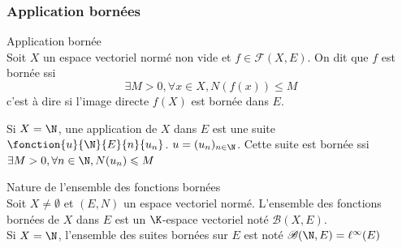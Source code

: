 \subsubsection{Application bornées}

\begin{definition}{Application bornée}{}
    \\Soit $X$ un espace vectoriel normé non vide et $f \in \mathscr F(X, E)$. 
    On dit que $f$ est bornée ssi
     $$\exists M > 0, \forall x \in X, N(f(x)) \leqslant M$$
    c'est à dire si l'image directe $f(X)$ est bornée dans $E$. 
\end{definition}

\begin{exemple}
    Si $X = \N$, une application de $X$ dans $E$ est une suite $\fonction{u}{\N}{E}{n}{u_n}$.
    $u = (u_n)_{n \in \N}$.  Cette suite est bornée ssi $\exists M > 0, \forall n \in \N, N(u_n) \leqslant M$
\end{exemple}

\begin{proposition}{Nature de l'ensemble des fonctions bornées}{}
    \\Soit $X \neq \emptyset$ et $(E, N)$ un espace vectoriel normé. 
    L'ensemble des fonctions bornées de $X$ dans $E$ est un $\K$-espace vectoriel noté
    $\mathscr B(X, E)$. \\

    Si $X = \N$, l'ensemble des suites bornées sur $E$ est noté $\mathscr B(\N, E) = \ell^\infty (E)$
\end{proposition}


